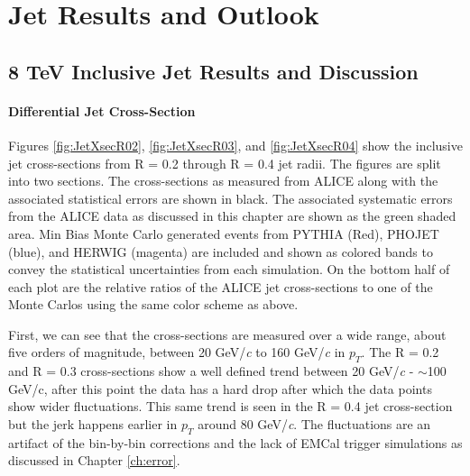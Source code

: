 \chapter{Jet Results and Outlook} \label{ch:cando}

\section{8 TeV Inclusive Jet Results and Discussion}

\subsubsection{Differential Jet Cross-Section}


\noindent
Figures \ref{fig:JetXsecR02}, \ref{fig:JetXsecR03}, and \ref{fig:JetXsecR04} show the inclusive jet cross-sections from R = 0.2 through R = 0.4 jet radii.  The figures are split into two sections.  The cross-sections as measured from ALICE along with the associated statistical errors are shown in black.  The associated systematic errors from the ALICE data as discussed in this chapter are shown as the green shaded area.  Min Bias Monte Carlo generated events from PYTHIA (Red), PHOJET (blue), and HERWIG (magenta) are included and shown as colored bands to convey the statistical uncertainties from each simulation.  On the bottom half of each plot are the relative ratios of the ALICE jet cross-sections to one of the Monte Carlos using the same color scheme as above.  

First, we can see that the cross-sections are measured over a wide range, about five orders of magnitude, between 20 GeV/\textit{c} to 160 GeV/\textit{c} in $p_{T}$. The R = 0.2 and R = 0.3 cross-sections show a well defined trend between 20 GeV/\textit{c} - $\sim$100 GeV/c, after this point the data  has a hard drop after which the data points show wider fluctuations.  This same trend is seen in the R = 0.4 jet cross-section but the jerk happens earlier in $p_{T}$ around  80 GeV/\textit{c}.  The fluctuations are an artifact of the bin-by-bin corrections and the lack of EMCal trigger simulations as discussed in Chapter \ref{ch:error}.  

